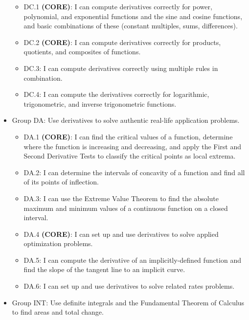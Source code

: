 \documentclass[]{article}
\providecommand{\tightlist}{%
  \setlength{\itemsep}{0pt}\setlength{\parskip}{0pt}}
\begin{document}
\begin{itemize}
  \begin{itemize}
  \tightlist
  \item
    DC.1 \textbf{(CORE)}: I can compute derivatives correctly for power,
    polynomial, and exponential functions and the sine and cosine
    functions, and basic combinations of these (constant multiples,
    sums, differences).
  \item
    DC.2 \textbf{(CORE)}: I can compute derivatives correctly for
    products, quotients, and composites of functions.\\
  \item
    DC.3: I can compute derivatives correctly using multiple rules in
    combination.
  \item
    DC.4: I can compute the derivatives correctly for logarithmic,
    trigonometric, and inverse trigonometric functions.
  \end{itemize}
\item
  Group DA: Use derivatives to solve authentic real-life application
  problems.

  \begin{itemize}
  \tightlist
  \item
    DA.1 \textbf{(CORE)}: I can find the critical values of a function,
    determine where the function is increasing and decreasing, and apply
    the First and Second Derivative Tests to classify the critical
    points as local extrema.
  \item
    DA.2: I can determine the intervals of concavity of a function and
    find all of its points of inflection.
  \item
    DA.3: I can use the Extreme Value Theorem to find the absolute
    maximum and minimum values of a continuous function on a closed
    interval.
  \item
    DA.4 \textbf{(CORE)}: I can set up and use derivatives to solve
    applied optimization problems.
  \item
    DA.5: I can compute the derivative of an implicitly-defined function
    and find the slope of the tangent line to an implicit curve.
  \item
    DA.6: I can set up and use derivatives to solve related rates
    problems.
  \end{itemize}
\item
  Group INT: Use definite integrals and the Fundamental Theorem of
  Calculus to find areas and total change.


\end{itemize}
\end{document}
